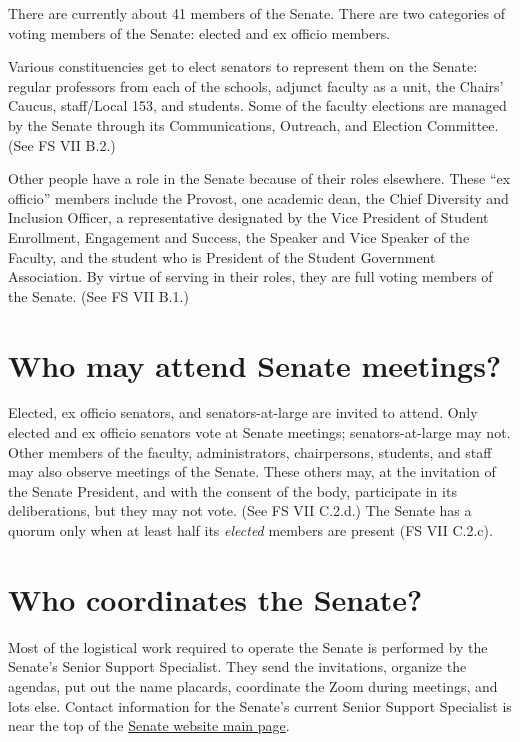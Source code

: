 \documentclass[12pt]{article}
\begin{document}
There are currently about 41 members of the Senate. There are two
categories of voting members of the Senate: elected and ex officio
members.

Various constituencies get to elect senators to represent them on the
Senate: regular professors from each of the schools, adjunct faculty as
a unit, the Chairs' Caucus, staff/Local 153, and students. Some of the
faculty elections are managed by the Senate through its Communications,
Outreach, and Election Committee. (See FS VII B.2.)

Other people have a role in the Senate because of their roles elsewhere.
These ``ex officio'' members include the Provost, one academic dean, the
Chief Diversity and Inclusion Officer, a representative designated by
the Vice President of Student Enrollment, Engagement and Success, the
Speaker and Vice Speaker of the Faculty, and the student who is
President of the Student Government Association. By virtue of serving in
their roles, they are full voting members of the Senate. (See FS VII
B.1.)

\section{Who may attend Senate
meetings?}\label{who-may-attend-senate-meetings}

Elected, ex officio senators, and senators-at-large are invited to
attend. Only elected and ex officio senators vote at Senate meetings;
senators-at-large may not. Other members of the faculty, administrators,
chairpersons, students, and staff may also observe meetings of the
Senate. These others may, at the invitation of the Senate President, and
with the consent of the body, participate in its deliberations, but they
may not vote. (See FS VII C.2.d.) The Senate has a quorum only when at
least half its \emph{elected} members are present (FS VII C.2.c).

\section{Who coordinates the Senate?}\label{who-coordinates-the-senate}

Most of the logistical work required to operate the Senate is performed
by the Senate's Senior Support Specialist. They send the invitations,
organize the agendas, put out the name placards, coordinate the Zoom
during meetings, and lots else. Contact information for the Senate's
current Senior Support Specialist is near the top of the
\href{https://www.hofstra.edu/senate/}{Senate website main page}.
\end{document}
